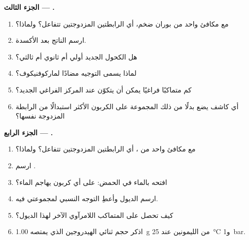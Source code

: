 \begin{problem}
\medskip
\noindent\textbf{الجزء الثالث --- .}
\begin{enumerate}[resume]
  \item مع مكافئ واحد من بوران ضخم، أي الرابطتين المزدوجتين تتفاعل؟ ولماذا؟
  \item ارسم الناتج بعد الأكسدة.
  \item هل الكحول الجديد أولي أم ثانوي أم ثالثي؟
  \item لماذا يسمى التوجيه مضادًا لماركوفنيكوف؟
  \item كم متماكبًا فراغيًا يمكن أن يتكوّن عند المركز الفراغي الجديد؟
  \item أي كاشف يضع بدلًا من ذلك المجموعة  على الكربون الأكثر استبدالًا من
        الرابطة المزدوجة نفسها؟
\end{enumerate}

\medskip
\noindent\textbf{الجزء الرابع --- .}
\begin{enumerate}[resume]
  \item مع مكافئ واحد من ، أي الرابطتين المزدوجتين تتفاعل؟ ولماذا؟
  \item ارسم .
  \item افتحه بالماء في الحمض: على أي كربون يهاجم الماء؟
  \item ارسم الديول وأعطِ التوجه النسبي لمجموعتي  فيه.
  \item كيف تحصل على المتماكب اللامرآوي الآخر لهذا الديول؟
  \item اذكر حجم ثنائي الهيدروجين الذي يمتصه \qty{1.00}{g} من الليمونين عند
        \qty{25}{\degreeCelsius} و\qty{1}{bar}.
\end{enumerate}
\end{problem}
